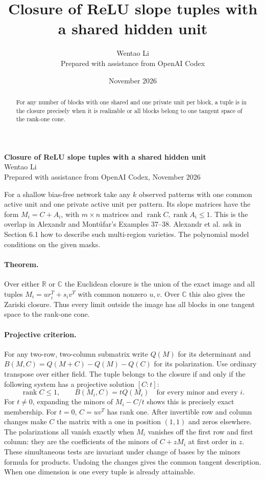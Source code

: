 \documentclass[10pt]{article}
\title{Closure of ReLU slope tuples with a shared hidden unit}
\author{Wentao Li\\{\small Prepared with assistance from OpenAI Codex}}
\date{November 2026}
\begin{document}
\begin{center}{\Large\bfseries Closure of ReLU slope tuples with a shared hidden unit}\\[3pt]Wentao Li\\{\small Prepared with assistance from OpenAI Codex, November 2026}\end{center}
\begin{abstract}
For any number of blocks with one shared and one private unit per block, a tuple is in the closure precisely when it is realizable or all blocks belong to one tangent space of the rank-one cone.
\end{abstract}
For a shallow bias-free network take any $k$ observed patterns with one common active unit and one private active unit per pattern. Its slope matrices have the form $M_i=C+A_i$, with $m\times n$ matrices and $\operatorname{rank}C,\operatorname{rank}A_i\le1$. This is the overlap in Alexandr and Mont\'ufar's Examples 37--38. Alexandr et al. ask in Section 6.1 how to describe such multi-region varieties. The polynomial model conditions on the given masks.

\paragraph{Theorem.} Over either $\mathbb R$ or $\mathbb C$ the Euclidean closure is the union of the exact image and all tuples $M_i=ur_i^T+s_iv^T$ with common nonzero $u,v$. Over $\mathbb C$ this also gives the Zariski closure. Thus every limit outside the image has all blocks in one tangent space to the rank-one cone.

\paragraph{Projective criterion.} For any two-row, two-column submatrix write $Q(M)$ for its determinant and $B(M,C)=Q(M+C)-Q(M)-Q(C)$ for its polarization. Use ordinary transpose over either field. The tuple belongs to the closure if and only if the following system has a projective solution $[C:t]$:
\[
 \operatorname{rank}C\le1,\qquad B(M_i,C)=tQ(M_i)\quad\text{for every minor and every }i.
\]
For $t\ne0$, expanding the minors of $M_i-C/t$ shows this is precisely exact membership. For $t=0$, $C=uv^T$ has rank one. After invertible row and column changes make $C$ the matrix with a one in position $(1,1)$ and zeros elsewhere. The polarizations all vanish exactly when $M_i$ vanishes off the first row and first column: they are the coefficients of the minors of $C+zM_i$ at first order in $z$. These simultaneous tests are invariant under change of bases by the minors formula for products. Undoing the changes gives the common tangent description. When one dimension is one every tuple is already attainable.
\end{document}
